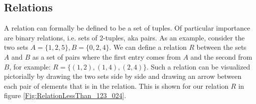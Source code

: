 \subsection{Relations}
A relation can formally be defined to be a set of tuples. Of particular importance are binary relations, i.e. sets of 2-tuples, aka pairs. As an example, consider the two sets $A = \{1,2,5\}, B = \{0,2,4\}$. We can define a relation $R$ between the sets $A$ and $B$ as a set of pairs where the first entry comes from $A$ and the second from $B$, for example: $R = \{(1,2),(1,4),(2,4)\}$. Such a relation can be visualized pictorially by drawing the two sets side by side and drawing an arrow between each pair of elements that is in the relation. This is shown for our relation $R$ in figure \ref{Fig:RelationLessThan_123_024}.

